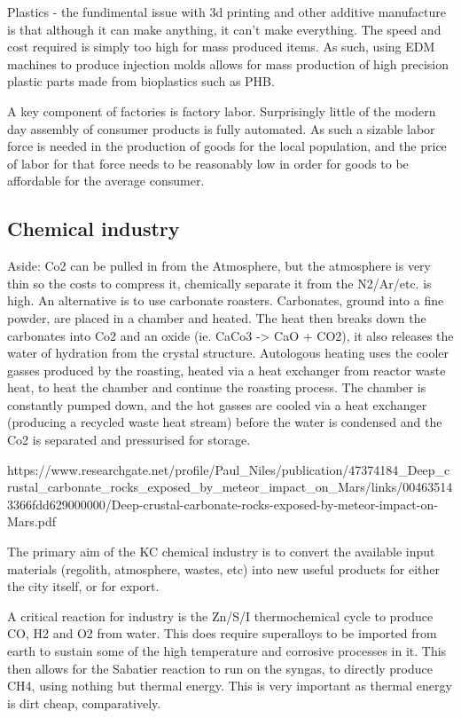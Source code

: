 \documentclass[10pt]{article}
\begin{document}
Plastics - the fundimental issue with 3d printing and other additive manufacture is that although it can make anything, it can't make everything. The speed and cost required is simply too high for mass produced items. As such, using EDM machines to produce injection molds allows for mass production of high precision plastic parts made from bioplastics such as PHB.

A key component of factories is factory labor. Surprisingly little of the modern day assembly of consumer products is fully automated. As such a sizable labor force is needed in the production of goods for the local population, and the price of labor for that force needs to be reasonably low in order for goods to be affordable for the average consumer.


\subsection*{Chemical industry}
Aside:
Co2 can be pulled in from the Atmosphere, but the atmosphere is very thin so the costs to compress it, chemically separate it from the N2/Ar/etc. is high. An alternative is to use carbonate roasters. Carbonates, ground into a fine powder, are placed in a chamber and heated. The heat then breaks down the carbonates into Co2 and an oxide (ie. CaCo3 -> CaO + CO2), it also releases the water of hydration from the crystal structure. Autologous heating uses the cooler gasses produced by the roasting, heated via a heat exchanger from reactor waste heat, to heat the chamber and continue the roasting process. The chamber is constantly pumped down, and the hot gasses are cooled via a heat exchanger (producing a recycled waste heat stream) before the water is condensed and the Co2 is separated and pressurised for storage.

https://www.researchgate.net/profile/Paul_Niles/publication/47374184_Deep_crustal_carbonate_rocks_exposed_by_meteor_impact_on_Mars/links/004635143366fdd629000000/Deep-crustal-carbonate-rocks-exposed-by-meteor-impact-on-Mars.pdf


The primary aim of the KC chemical industry is to convert the available input materials (regolith, atmosphere, wastes, etc) into new useful products for either the city itself, or for export.

A critical reaction for industry is the Zn/S/I thermochemical cycle to produce CO, H2 and O2 from water. This does require superalloys to be imported from earth to sustain some of the high temperature and corrosive processes in it. This then allows for the Sabatier reaction to run on the syngas, to directly produce CH4, using nothing but thermal energy. This is very important as thermal energy is dirt cheap, comparatively.
\end{document}

